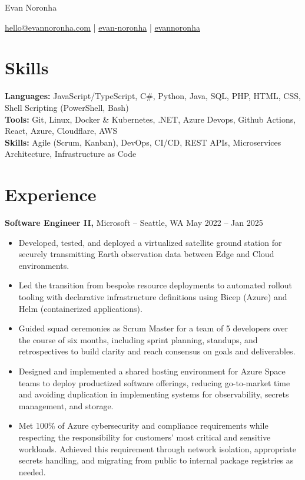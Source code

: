 \documentclass[11pt]{article}       %
\begin{document}
\centerline{\Huge Evan Noronha}

\vspace{5pt}

\centerline {\href{mailto:hello@evannoronha.com}{\faEnvelope \space hello@evannoronha.com} | \href{https://www.linkedin.com/in/evan-noronha/}{\faLinkedin \space evan-noronha} | \href{https://github.com/evannoronha}{\faGithub \space evannoronha}}

\vspace{-10pt}

\section*{Skills}
\textbf{Languages:} JavaScript/TypeScript, C\#, Python, Java, SQL, PHP, HTML, CSS, Shell Scripting (PowerShell, Bash) \\
\textbf{Tools:} Git, Linux, Docker \& Kubernetes, .NET, Azure Devops, Github Actions, React, Azure, Cloudflare, AWS \\
\textbf{Skills:} Agile (Scrum, Kanban), DevOps, CI/CD, REST APIs, Microservices Architecture, Infrastructure as Code \\

\vspace{-6.5pt}

\section*{Experience}
\textbf{Software Engineer II,} {Microsoft} -- Seattle, WA \hfill May 2022 -- Jan 2025 \\
\vspace{-9pt}
\begin{itemize}
  \item Developed, tested, and deployed a virtualized satellite ground station for securely transmitting Earth observation data between Edge and Cloud environments.
  \item Led the transition from bespoke resource deployments to automated rollout tooling with declarative infrastructure definitions using Bicep (Azure) and Helm (containerized applications).
  \item Guided squad ceremonies as Scrum Master for a team of 5 developers over the course of six months, including sprint planning, standups, and retrospectives to build clarity and reach consensus on goals and deliverables.
  \item Designed and implemented a shared hosting environment for Azure Space teams to deploy productized software offerings, reducing go-to-market time and avoiding duplication in implementing systems for observability, secrets management, and storage.
  \item Met 100\% of Azure cybersecurity and compliance requirements while respecting the responsibility for customers' most critical and sensitive workloads. Achieved this requirement through network isolation, appropriate secrets handling, and migrating from public to internal package registries as needed.
\end{itemize}
\end{document}
